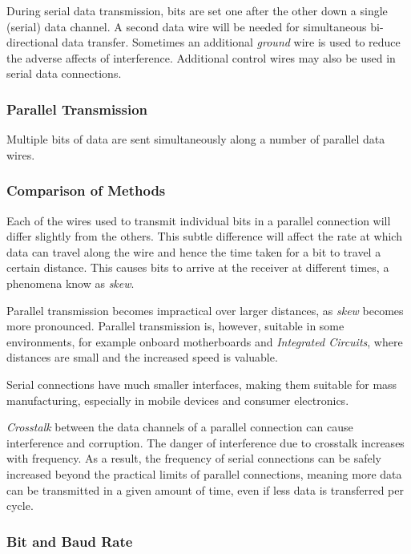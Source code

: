 \documentclass[9pt]{article}
\begin{document}
During serial data transmission, bits are set one after the other down a single (serial) data channel. A second data wire will be needed for simultaneous bi-directional data transfer. Sometimes an additional \emph{ground} wire is used to reduce the adverse affects of interference. Additional control wires may also be used in serial data connections.

\subsubsection{Parallel Transmission}
\label{sec:org00ba9fd}

Multiple bits of data are sent simultaneously along a number of parallel data wires.

\subsubsection{Comparison of Methods}
\label{sec:orgcb71668}

Each of the wires used to transmit individual bits in a parallel connection will differ slightly from the others. This subtle difference will affect the rate at which data can travel along the wire and hence the time taken for a bit to travel a certain distance. This causes bits to arrive at the receiver at different times, a phenomena know as \emph{skew}.

Parallel transmission becomes impractical over larger distances, as \emph{skew} becomes more pronounced. Parallel transmission is, however, suitable in some environments, for example onboard motherboards and \emph{Integrated Circuits}, where distances are small and the increased speed is valuable.

Serial connections have much smaller interfaces, making them suitable for mass manufacturing, especially in mobile devices and consumer electronics.

\emph{Crosstalk} between the data channels of a parallel connection can cause interference and corruption. The danger of interference due to crosstalk increases with frequency. As a result, the frequency of serial connections can be safely increased beyond the practical limits of parallel connections, meaning more data can be transmitted in a given amount of time, even if less data is transferred per cycle.

\subsubsection{Bit and Baud Rate}
\label{sec:orgafd00ea}
\end{document}
